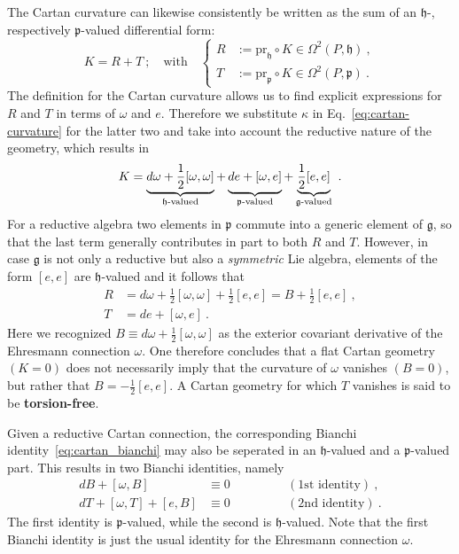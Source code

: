 \documentclass[11pt]{article}
\begin{document}
\blankline
The Cartan curvature can likewise consistently be written as the 
sum of an $\mathfrak{h}$-, respectively $\mathfrak{p}$-valued 
differential form:
%
\begin{displaymath}
	K = R + T~;\quad
	\text{with}
	\quad\left\{
	\begin{aligned}
		R &:= \mathrm{pr}_\mathfrak{h} \circ K \in 
		\Omega^2(P,\mathfrak{h})~,\\
		T &:= \mathrm{pr}_\mathfrak{p} \circ K\in 
		\Omega^2(P,\mathfrak{p})~.
	\end{aligned}
	\right.
\end{displaymath}
%
The definition for the Cartan curvature allows us to find 
explicit expressions for $R$ and $T$ in terms of $\omega$ and 
$e$.  Therefore we substitute $\kappa$ in 
Eq.~\eqref{eq:cartan-curvature} for the latter two and take into 
account the reductive nature of the geometry, which results in 
%
\begin{displaymath}
	K = \underbrace{d\omega + 
		\frac{1}{2}[\omega,\omega]}_{\mathfrak{h}\text{-valued}}
		+ \underbrace{\vphantom{\frac{1}{2}} de + 
			[\omega,e]}_{\mathfrak{p}\text{-valued}} +
	\underbrace{\frac{1}{2}[e,e]}_{\mathfrak{g}\text{-valued}}~.
\end{displaymath}
For a reductive algebra two elements in $\mathfrak{p}$ commute 
into a generic element of $\mathfrak{g}$, so that the last term 
generally contributes in part to both $R$ and $T$. However, in 
case $\mathfrak{g}$ is not only a reductive but also a 
\emph{symmetric} Lie algebra, elements of the form $[e,e]$ are 
$\mathfrak{h}$-valued and it follows that
\begin{align*}
	R &= d\omega + \frac{1}{2}[\omega,\omega]  + 
	\frac{1}{2}[e,e]
	= B + \tfrac{1}{2}[e,e]~,\\
	T &= de + [\omega,e]~.
\end{align*}
Here we recognized $B \equiv d\omega + 
\tfrac{1}{2}[\omega,\omega]$ as the exterior covariant derivative 
of the Ehresmann connection $\omega$. One therefore concludes 
that a flat Cartan geometry $(K=0)$ does not necessarily imply 
that the curvature of $\omega$ vanishes $(B=0)$, but rather that 
$B = -\tfrac{1}{2}[e,e]$.
A Cartan geometry for which $T$ vanishes is said to be 
\textbf{torsion-free}.

Given a reductive Cartan connection, the corresponding Bianchi 
identity~\eqref{eq:cartan_bianchi} may also be seperated in an 
$\mathfrak{h}$-valued and a $\mathfrak{p}$-valued part. This 
results in two Bianchi identities, namely
%
\begin{subequations}
\begin{alignat}{2}
	dB + [\omega,B] &\equiv 0 
	&\qquad\quad&(\text{1st identity})~,\\
	dT + [\omega,T] + [e,B] &\equiv 0 &&(\text{2nd identity})~.
\end{alignat}
\end{subequations}
The first identity is $\mathfrak{p}$-valued, while the second is 
$\mathfrak{h}$-valued.
Note that the first Bianchi identity is just the usual identity 
for the Ehresmann connection $\omega$.
\end{document}
